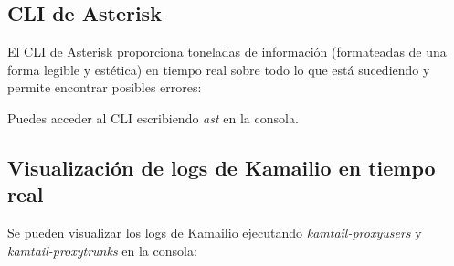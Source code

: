 \documentclass[letterpaper,10pt,spanish]{sphinxmanual}
\begin{document}
\subsection{CLI de Asterisk}
\label{maintenance/log_viewer:asterisk-cli}
El CLI de Asterisk proporciona toneladas de información (formateadas de una forma legible y estética) en tiempo real sobre todo lo que está sucediendo y permite encontrar posibles errores:

\noindent{}

Puedes acceder al CLI escribiendo \emph{ast} en la consola.


\subsection{Visualización de logs de Kamailio en tiempo real}
\label{maintenance/log_viewer:kamailio-realtime-log-viewing}
Se pueden visualizar los logs de Kamailio ejecutando \emph{kamtail-proxyusers} y  \emph{kamtail-proxytrunks} en la consola:

\noindent{}



\renewcommand{\indexname}{Índice}
\printindex
\end{document}

